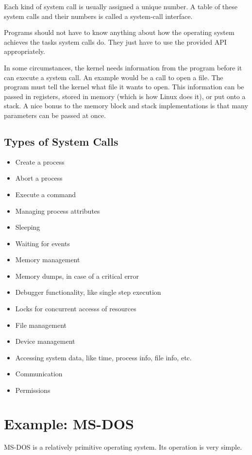 \documentclass{article}
\begin{document}
Each kind of system call is usually assigned a unique number. A table of these
system calls and their numbers is called a system-call interface.

Programs should not have to know anything about how the operating system
achieves the tasks system calls do. They just have to use the provided API
appropriately.

In some circumstances, the kernel needs information from the program before it
can execute a system call. An example would be a call to open a file. The
program must tell the kernel what file it wants to open. This information can
be passed in registers, stored in memory (which is how Linux does it), or put
onto a stack. A nice bonus to the memory block and stack implementations is
that many parameters can be passed at once.

\subsection{Types of System Calls}
\begin{itemize}
	\item Create a process
	\item Abort a process
	\item Execute a command
	\item Managing process attributes
	\item Sleeping
	\item Waiting for events
	\item Memory management
	\item Memory dumps, in case of a critical error
	\item Debugger functionality, like single step execution
	\item Locks for concurrent accesss of resources
	\item File management
	\item Device management
	\item Accessing system data, like time, process info, file info, etc.
	\item Communication
	\item Permissions
\end{itemize}

\section{Example: MS-DOS}
MS-DOS is a relatively primitive operating system. Its operation is very
simple.
\end{document}
